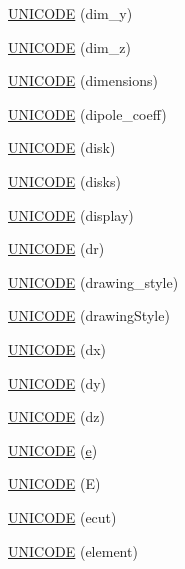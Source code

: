 \begin{DoxyCompactItemize}
\hyperlink{namespace_d_d4hep_1_1_x_m_l_aa0d75523b6d65266fed937fd82b2cf95}{U\+N\+I\+C\+O\+DE} (dim\+\_\+y)
\item 
\hyperlink{namespace_d_d4hep_1_1_x_m_l_a3abc4c62078547befb261956ff0446d3}{U\+N\+I\+C\+O\+DE} (dim\+\_\+z)
\item 
\hyperlink{namespace_d_d4hep_1_1_x_m_l_af4d7437f2425852ea22220b7d1e8393c}{U\+N\+I\+C\+O\+DE} (dimensions)
\item 
\hyperlink{namespace_d_d4hep_1_1_x_m_l_a0f1f224621ec7e709b21ca1b75e7ebbc}{U\+N\+I\+C\+O\+DE} (dipole\+\_\+coeff)
\item 
\hyperlink{namespace_d_d4hep_1_1_x_m_l_a5631e45a013c4bedc382122d95d3f4fc}{U\+N\+I\+C\+O\+DE} (disk)
\item 
\hyperlink{namespace_d_d4hep_1_1_x_m_l_ac71faf9bffd40868e3e3d4af7a04ee27}{U\+N\+I\+C\+O\+DE} (disks)
\item 
\hyperlink{namespace_d_d4hep_1_1_x_m_l_a8466aab9e167c4e071161eadadba94af}{U\+N\+I\+C\+O\+DE} (display)
\item 
\hyperlink{namespace_d_d4hep_1_1_x_m_l_ad4c3ac2510eaeef496cf8a075a3231dc}{U\+N\+I\+C\+O\+DE} (dr)
\item 
\hyperlink{namespace_d_d4hep_1_1_x_m_l_a9e58172414cd3b231ebf29cb2395bcf5}{U\+N\+I\+C\+O\+DE} (drawing\+\_\+style)
\item 
\hyperlink{namespace_d_d4hep_1_1_x_m_l_a89e98aa63dcfc0c7b304680e58580c8f}{U\+N\+I\+C\+O\+DE} (drawing\+Style)
\item 
\hyperlink{namespace_d_d4hep_1_1_x_m_l_adadf4d5b7da03dcbd4e4cd72ef9d950c}{U\+N\+I\+C\+O\+DE} (dx)
\item 
\hyperlink{namespace_d_d4hep_1_1_x_m_l_a75080433f03e6865b56e37aab34d368e}{U\+N\+I\+C\+O\+DE} (dy)
\item 
\hyperlink{namespace_d_d4hep_1_1_x_m_l_ab5297e38b4c516b1c9788750b2bc877a}{U\+N\+I\+C\+O\+DE} (dz)
\item 
\hyperlink{namespace_d_d4hep_1_1_x_m_l_a9fb3841cc02ceae3c888be5d6546e675}{U\+N\+I\+C\+O\+DE} (\hyperlink{_volumes_8cpp_a8a9a1f93e9b09afccaec215310e64142}{e})
\item 
\hyperlink{namespace_d_d4hep_1_1_x_m_l_a0874067e7206a319be9e71cfd47318ed}{U\+N\+I\+C\+O\+DE} (E)
\item 
\hyperlink{namespace_d_d4hep_1_1_x_m_l_a589a8a5c3603d6307296280f4cb57ba0}{U\+N\+I\+C\+O\+DE} (ecut)
\item 
\hyperlink{namespace_d_d4hep_1_1_x_m_l_a84c0ac1394a5335a051a2da0e01c9356}{U\+N\+I\+C\+O\+DE} (element)
\item 

\end{DoxyCompactItemize}
